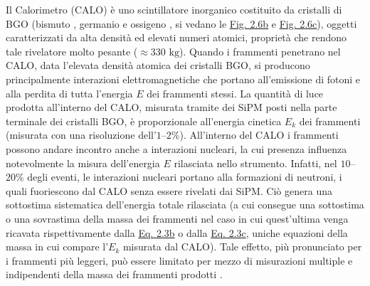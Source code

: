 \documentclass[12pt,a4paper,twoside]{report}
\begin{document}
	Il Calorimetro (CALO) è uno scintillatore inorganico costituito da cristalli di BGO (bismuto , germanio  e ossigeno , si vedano le \hyperref[fig:calo]{Fig. 2.6b} e \hyperref[fig:calo2]{Fig. 2.6c}), oggetti caratterizzati da alta densità ed elevati numeri atomici, proprietà che rendono tale rivelatore molto pesante ($\approx330\mbox{ kg}$). Quando i frammenti penetrano nel CALO, data l'elevata densità atomica dei cristalli BGO, si producono principalmente interazioni elettromagnetiche che portano all'emissione di fotoni e alla perdita di tutta l'energia $E$ dei frammenti stessi. La quantità di luce prodotta all'interno del CALO, misurata tramite dei SiPM posti nella parte terminale dei cristalli BGO, è proporzionale all'energia cinetica $E_k$ dei frammenti (misurata con una risoluzione dell'$1$--$2\%$). All'interno del CALO i frammenti possono andare incontro anche a interazioni nucleari, la cui presenza influenza notevolmente la misura dell'energia $E$ rilasciata nello strumento. Infatti, nel $10$--$20\%$ degli eventi, le interazioni nucleari portano alla formazioni di neutroni, i quali fuoriescono dal CALO senza essere rivelati dai SiPM. Ciò genera una sottostima sistematica dell'energia totale rilasciata (a cui consegue una sottostima o una sovrastima della massa dei frammenti nel caso in cui quest'ultima venga ricavata rispettivamente dalla \hyperref[eq:a2]{Eq. 2.3b} o dalla \hyperref[eq:a3]{Eq. 2.3c}, uniche equazioni della massa in cui compare l'$E_k$ misurata dal CALO). Tale effetto, più pronunciato per i frammenti più leggeri, può essere limitato per mezzo di misurazioni multiple e indipendenti della massa dei frammenti prodotti \cite{foot_cdr}.
	
\end{document}
